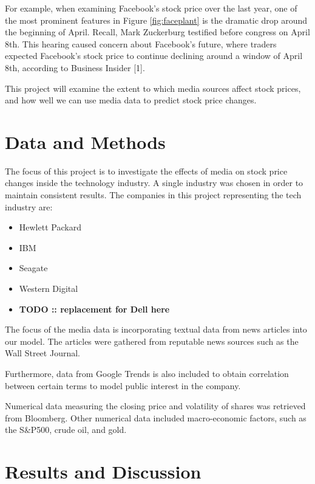 \documentclass{article}
\begin{document}
For example, when examining Facebook's stock price over the last year, one of the most prominent features in Figure \ref{fig:faceplant} is the dramatic drop around the beginning of April. Recall, Mark Zuckerburg testified before congress on April 8th. This hearing caused concern about Facebook's future, where traders expected Facebook's stock price to continue declining around a window of April 8th, according to Business Insider [1].

This project will examine the extent to which media sources affect stock prices, and how well we can use media data to predict stock price changes. 

\newpage 

\section{Data and Methods}

The focus of this project is to investigate the effects of media on stock price changes inside the technology industry. A single industry was chosen in order to maintain consistent results. The companies in this project representing the tech industry are: \begin{itemize}
\item Hewlett Packard
\item IBM
\item Seagate
\item Western Digital
\item \textbf{TODO :: replacement for Dell here}
\end{itemize}

The focus of the media data is incorporating textual data from news articles into our model. The articles were gathered from reputable news sources such as the Wall Street Journal. 

Furthermore, data from Google Trends is also included to obtain correlation between certain terms to model public interest in the company.  

Numerical data measuring the closing price and volatility of shares was retrieved from Bloomberg. Other numerical data included macro-economic factors, such as the S\&P500, crude oil, and gold. 

\section{Results and Discussion}
\end{document}
